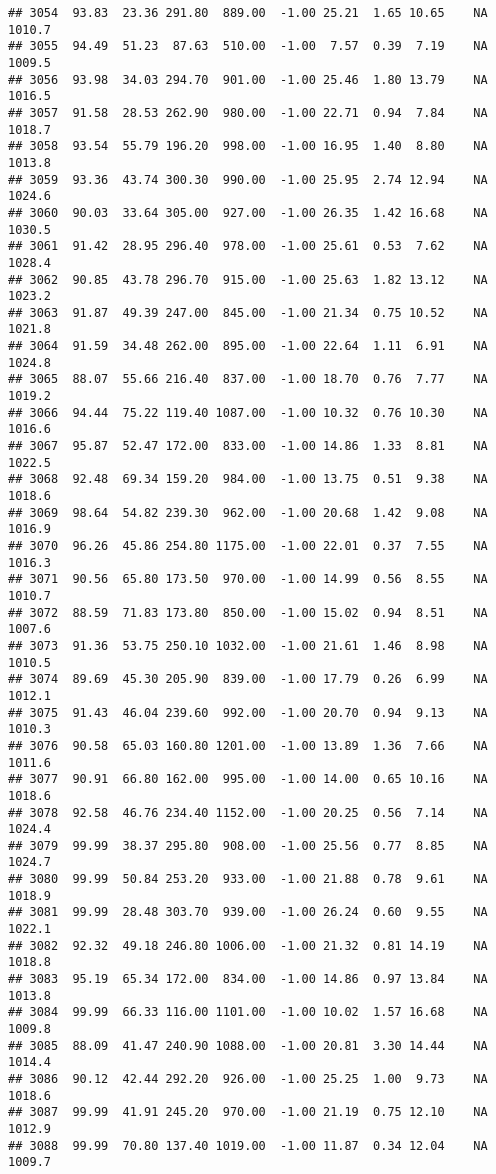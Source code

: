 \documentclass{article}\usepackage{graphicx, color}
\makeatletter
\newenvironment{kframe}{%
 \def\at@end@of@kframe{}%
 \ifinner\ifhmode%
  \def\at@end@of@kframe{\end{minipage}}%
  \begin{minipage}{\columnwidth}%
 \fi\fi%
 \def\FrameCommand##1{\hskip\@totalleftmargin \hskip-\fboxsep
 \colorbox{shadecolor}{##1}\hskip-\fboxsep
     \hskip-\linewidth \hskip-\@totalleftmargin \hskip\columnwidth}%
 \MakeFramed {\advance\hsize-\width
   \@totalleftmargin\z@ \linewidth\hsize
   \@setminipage}}%
 {\par\unskip\endMakeFramed%
 \at@end@of@kframe}
\newenvironment{knitrout}{}{} %
\makeatother
\begin{document}
\begin{knitrout}
\begin{kframe}
\begin{verbatim}
## 3054  93.83  23.36 291.80  889.00  -1.00 25.21  1.65 10.65    NA 1010.7
## 3055  94.49  51.23  87.63  510.00  -1.00  7.57  0.39  7.19    NA 1009.5
## 3056  93.98  34.03 294.70  901.00  -1.00 25.46  1.80 13.79    NA 1016.5
## 3057  91.58  28.53 262.90  980.00  -1.00 22.71  0.94  7.84    NA 1018.7
## 3058  93.54  55.79 196.20  998.00  -1.00 16.95  1.40  8.80    NA 1013.8
## 3059  93.36  43.74 300.30  990.00  -1.00 25.95  2.74 12.94    NA 1024.6
## 3060  90.03  33.64 305.00  927.00  -1.00 26.35  1.42 16.68    NA 1030.5
## 3061  91.42  28.95 296.40  978.00  -1.00 25.61  0.53  7.62    NA 1028.4
## 3062  90.85  43.78 296.70  915.00  -1.00 25.63  1.82 13.12    NA 1023.2
## 3063  91.87  49.39 247.00  845.00  -1.00 21.34  0.75 10.52    NA 1021.8
## 3064  91.59  34.48 262.00  895.00  -1.00 22.64  1.11  6.91    NA 1024.8
## 3065  88.07  55.66 216.40  837.00  -1.00 18.70  0.76  7.77    NA 1019.2
## 3066  94.44  75.22 119.40 1087.00  -1.00 10.32  0.76 10.30    NA 1016.6
## 3067  95.87  52.47 172.00  833.00  -1.00 14.86  1.33  8.81    NA 1022.5
## 3068  92.48  69.34 159.20  984.00  -1.00 13.75  0.51  9.38    NA 1018.6
## 3069  98.64  54.82 239.30  962.00  -1.00 20.68  1.42  9.08    NA 1016.9
## 3070  96.26  45.86 254.80 1175.00  -1.00 22.01  0.37  7.55    NA 1016.3
## 3071  90.56  65.80 173.50  970.00  -1.00 14.99  0.56  8.55    NA 1010.7
## 3072  88.59  71.83 173.80  850.00  -1.00 15.02  0.94  8.51    NA 1007.6
## 3073  91.36  53.75 250.10 1032.00  -1.00 21.61  1.46  8.98    NA 1010.5
## 3074  89.69  45.30 205.90  839.00  -1.00 17.79  0.26  6.99    NA 1012.1
## 3075  91.43  46.04 239.60  992.00  -1.00 20.70  0.94  9.13    NA 1010.3
## 3076  90.58  65.03 160.80 1201.00  -1.00 13.89  1.36  7.66    NA 1011.6
## 3077  90.91  66.80 162.00  995.00  -1.00 14.00  0.65 10.16    NA 1018.6
## 3078  92.58  46.76 234.40 1152.00  -1.00 20.25  0.56  7.14    NA 1024.4
## 3079  99.99  38.37 295.80  908.00  -1.00 25.56  0.77  8.85    NA 1024.7
## 3080  99.99  50.84 253.20  933.00  -1.00 21.88  0.78  9.61    NA 1018.9
## 3081  99.99  28.48 303.70  939.00  -1.00 26.24  0.60  9.55    NA 1022.1
## 3082  92.32  49.18 246.80 1006.00  -1.00 21.32  0.81 14.19    NA 1018.8
## 3083  95.19  65.34 172.00  834.00  -1.00 14.86  0.97 13.84    NA 1013.8
## 3084  99.99  66.33 116.00 1101.00  -1.00 10.02  1.57 16.68    NA 1009.8
## 3085  88.09  41.47 240.90 1088.00  -1.00 20.81  3.30 14.44    NA 1014.4
## 3086  90.12  42.44 292.20  926.00  -1.00 25.25  1.00  9.73    NA 1018.6
## 3087  99.99  41.91 245.20  970.00  -1.00 21.19  0.75 12.10    NA 1012.9
## 3088  99.99  70.80 137.40 1019.00  -1.00 11.87  0.34 12.04    NA 1009.7

\end{verbatim}
\end{kframe}
\end{knitrout}
\end{document}
